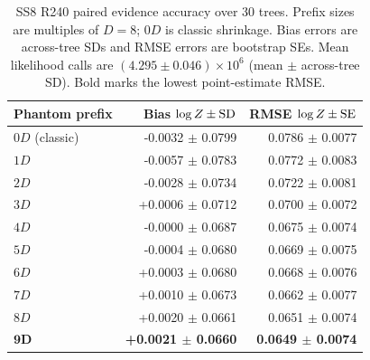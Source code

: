 \documentclass[pdflatex,sn-basic,icol]{sn-jnl}
\theoremstyle{plain}
\theoremstyle{definition}
\begin{document}
\begin{table}[t]
\caption{SS8 R240 paired evidence accuracy over 30 trees. Prefix sizes are multiples of $D=8$; $0D$ is classic shrinkage. Bias errors are across-tree SDs and RMSE errors are bootstrap SEs. Mean likelihood calls are $(4.295\pm0.046)\times10^6$ (mean $\pm$ across-tree SD). Bold marks the lowest point-estimate RMSE.}
\label{tab:phantom_evidence_ss8}
\centering
\scriptsize
\begin{tabular}{lrr}
\toprule
Phantom prefix & Bias $\log Z\mathbin{\pm}{\rm SD}$ & RMSE $\log Z\mathbin{\pm}{\rm SE}$ \\
\midrule
$0D$ (classic) & -0.0032 $\pm$ 0.0799 & 0.0786 $\pm$ 0.0077 \\
$1D$ & -0.0057 $\pm$ 0.0783 & 0.0772 $\pm$ 0.0083 \\
$2D$ & -0.0028 $\pm$ 0.0734 & 0.0722 $\pm$ 0.0081 \\
$3D$ & +0.0006 $\pm$ 0.0712 & 0.0700 $\pm$ 0.0072 \\
$4D$ & -0.0000 $\pm$ 0.0687 & 0.0675 $\pm$ 0.0074 \\
$5D$ & -0.0004 $\pm$ 0.0680 & 0.0669 $\pm$ 0.0075 \\
$6D$ & +0.0003 $\pm$ 0.0680 & 0.0668 $\pm$ 0.0076 \\
$7D$ & +0.0010 $\pm$ 0.0673 & 0.0662 $\pm$ 0.0077 \\
$8D$ & +0.0020 $\pm$ 0.0661 & 0.0651 $\pm$ 0.0074 \\
$\boldsymbol{9D}$ & \textbf{+0.0021 $\pm$ 0.0660} & \textbf{0.0649 $\pm$ 0.0074} \\
\bottomrule
\end{tabular}
\end{table}
\end{document}
